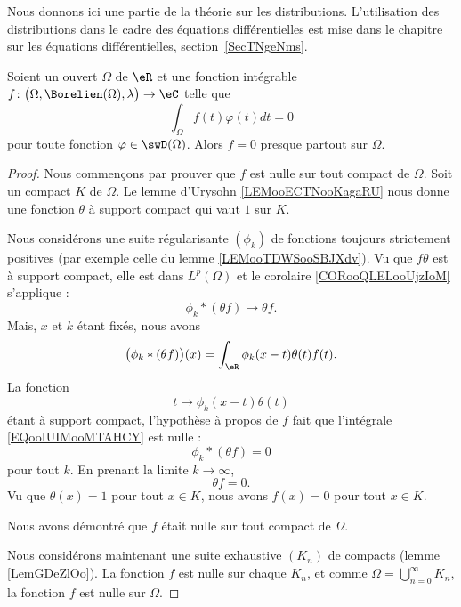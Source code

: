 
Nous donnons ici une partie de la théorie sur les distributions. L'utilisation des distributions dans le cadre des équations différentielles est mise dans le chapitre sur les équations différentielles, section~\ref{SecTNgeNms}.

\begin{proposition} \label{PropAAjSURG}
    Soient un ouvert \( \Omega\) de \( \eR\) et une fonction intégrable \( f\colon \big( \Omega,\Borelien(\Omega),\lambda \big)\to \eC\) telle que
    \begin{equation}
        \int_{\Omega}f(t)\varphi(t)dt=0
    \end{equation}
    pour toute fonction \( \varphi\in\swD(\Omega)\). Alors \( f=0\) presque partout sur \( \Omega\).
\end{proposition}

\begin{proof}
    Nous commençons par prouver que \( f\) est nulle sur tout compact de \( \Omega\). Soit un compact \( K\) de \( \Omega\). Le lemme d'Urysohn \ref{LEMooECTNooKagaRU} nous donne une fonction \( \theta\) à support compact qui vaut \( 1\) sur \( K\).

    Nous considérons une suite régularisante \( (\phi_k)\) de fonctions toujours strictement positives (par exemple celle du lemme \ref{LEMooTDWSooSBJXdv}). Vu que \( f\theta\) est à support compact, elle est dans \( L^p(\Omega)\) et le corolaire \ref{CORooQLELooUjzIoM} s'applique :
    \begin{equation}
        \phi_k*(\theta f)\to \theta f.
    \end{equation}
    Mais, \( x\) et \( k\) étant fixés, nous avons
    \begin{equation}        \label{EQooIUIMooMTAHCY}
        \big( \phi_k* (\theta f) \big)(x)=\int_{\eR}\phi_k(x-t)\theta(t)f(t).
    \end{equation}
    La fonction
    \begin{equation}
        t\mapsto \phi_k(x-t)\theta(t)
    \end{equation}
    étant à support compact, l'hypothèse à propos de \( f\) fait que l'intégrale \eqref{EQooIUIMooMTAHCY} est nulle :
    \begin{equation}
        \phi_k*(\theta f)=0
    \end{equation}
    pour tout \( k\). En prenant la limite \( k\to \infty\),
    \begin{equation}
        \theta f=0.
    \end{equation}
    Vu que \( \theta(x)=1\) pour tout \( x\in K\), nous avons \( f(x)=0\) pour tout \( x\in K\).

    Nous avons démontré que \( f\) était nulle sur tout compact de \( \Omega\).

    Nous considérons maintenant une suite exhaustive \( (K_n)\) de compacts (lemme \ref{LemGDeZlOo}). La fonction \( f\) est nulle sur chaque \( K_n\), et comme \( \Omega=\bigcup_{n=0}^{\infty}K_n\), la fonction \( f\) est nulle sur \( \Omega\).
\end{proof}

